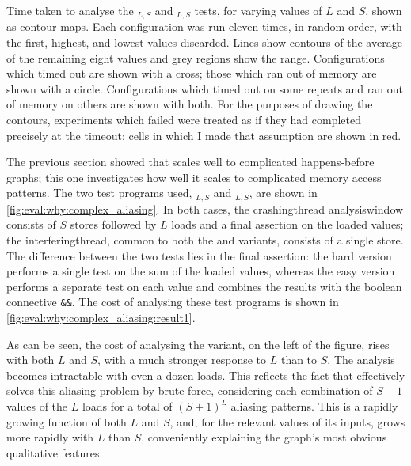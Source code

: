 \begin{sanefig}
  \caption{Time taken to analyse the
    $_{L,S}$ and
    $_{L,S}$ tests, for varying values
    of $L$ and $S$, shown as contour maps.  Each configuration was run
    eleven times, in random order, with the first, highest, and lowest
    values discarded.  Lines show contours of the average of the
    remaining eight values and grey regions show the range.
    Configurations which timed out are shown with a cross; those which
    ran out of memory are shown with a circle.  Configurations which
    timed out on some repeats and ran out of memory on others are
    shown with both.  For the purposes of drawing the contours,
    experiments which failed were treated as if they had completed
    precisely at the timeout; cells in which I made that assumption
    are shown in red.}
  \label{fig:eval:why:complex_aliasing:result1}
\end{sanefig}

\noindent
The previous section showed that {\technique} scales well to
complicated happens-before graphs; this one investigates how well it
scales to complicated memory access patterns.  The two test programs
used, $_{L,S}$ and
$_{L,S}$, are shown in
\autoref{fig:eval:why:complex_aliasing}.  In both cases, the
\gls{crashingthread} \gls{analysiswindow} consists of $S$ stores
followed by $L$ loads and a final assertion on the loaded values; the
\gls{interferingthread}, common to both the  and
 variants, consists of a single store.  The difference
between the two tests lies in the final assertion: the hard version
performs a single test on the sum of the loaded values, whereas the
easy version performs a separate test on each value and combines the
results with the boolean connective \texttt{\&\&}.  The cost of
analysing these test programs is shown in
\autoref{fig:eval:why:complex_aliasing:result1}.

As can be seen, the cost of analysing the  variant, on
the left of the figure, rises with both $L$ and $S$, with a much
stronger response to $L$ than to $S$.  The analysis becomes
intractable with even a dozen loads.  This reflects the fact that
{\technique} effectively solves this aliasing problem by brute
force, considering each combination of $S+1$ values of the $L$ loads
for a total of $(S+1)^L$ aliasing patterns.  This is a rapidly growing
function of both $L$ and $S$, and, for the relevant values of its
inputs, grows more rapidly with $L$ than $S$, conveniently explaining
the graph's most obvious qualitative features.\kern-1pt

